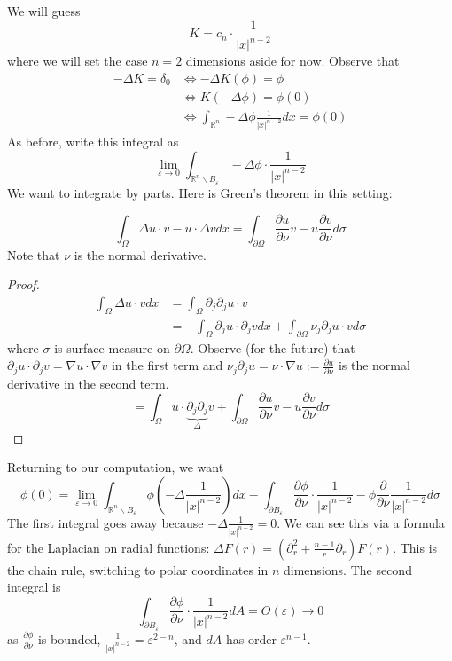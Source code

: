 We will guess
$$
K=c_{n} \cdot \frac{1}{|x|^{n-2}}
$$
where we will set the case $n=2$ dimensions aside for now. Observe that
$$
\begin{aligned}
    -\Delta K=\delta_{0} &\Longleftrightarrow-\Delta K(\phi)=\phi\\
&\Longleftrightarrow K(-\Delta \phi)=\phi(0) \\
&\Longleftrightarrow \int_{\mathbb{R}^{n}}-\Delta \phi \frac{1}{|x|^{n-2}} d x=\phi(0)
\end{aligned}
$$
As before, write this integral as
$$
\lim _{\varepsilon \rightarrow 0} \int_{\mathbb{R}^{n} \backslash B_{\varepsilon}}-\Delta \phi \cdot \frac{1}{|x|^{n-2}}
$$
We want to integrate by parts. Here is Green's theorem in this setting:
\begin{theorem}
\[
    \int_{\Omega} \Delta u \cdot v-u \cdot \Delta v d x=\int_{\partial \Omega} \frac{\partial u}{\partial \nu} v-u \frac{\partial v}{\partial \nu} d \sigma
\]
Note that $\nu$ is the normal derivative.
\end{theorem}
\begin{proof}
    $$
    \begin{aligned}
    \int_{\Omega} \Delta u \cdot v d x &=\int_{\Omega} \partial_{j} \partial_{j} u \cdot v \\
    &=-\int_{\Omega} \partial_{j} u \cdot \partial_{j} v d x+\int_{\partial \Omega} \nu_{j} \partial_{j} u \cdot v d \sigma
    \end{aligned}
    $$
    where $\sigma$ is surface measure on $\partial \Omega$. Observe (for the future) that $\partial_{j} u \cdot \partial_{j} v=\nabla u \cdot \nabla v$ in the first term and $\nu_{j} \partial_{j} u=\nu \cdot \nabla u:=\frac{\partial u}{\partial \nu}$ is the normal derivative in the second term.
    $$
    =\int_{\Omega} u \cdot \underbrace{\partial_{j} \partial_{j}}_{\Delta} v+\int_{\partial \Omega} \frac{\partial u}{\partial \nu} v-u \frac{\partial v}{\partial \nu} d \sigma
    $$
        
\end{proof}
Returning to our computation, we want
$$
\phi(0)=\lim _{\varepsilon \rightarrow 0} \int_{\mathbb{R}^{n} \backslash B_{\varepsilon}} \phi\left(-\Delta \frac{1}{|x|^{n-2}}\right) d x-\int_{\partial B_{\varepsilon}} \frac{\partial \phi}{\partial \nu} \cdot \frac{1}{|x|^{n-2}}-\phi \frac{\partial}{\partial \nu} \frac{1}{|x|^{n-2}} d \sigma
$$
The first integral goes away because $-\Delta \frac{1}{|x|^{n-2}}=0$. We can see this via a formula for the Laplacian on radial functions: $\Delta F(r)=\left(\partial_{r}^{2}+\frac{n-1}{r} \partial_{r}\right) F(r)$. This is the chain rule, switching to polar coordinates in $n$ dimensions.
The second integral is
$$
\int_{\partial B_{\varepsilon}} \frac{\partial \phi}{\partial \nu} \cdot \frac{1}{|x|^{n-2}} d A=O(\varepsilon) \rightarrow 0
$$
as $\frac{\partial \phi}{\partial \nu}$ is bounded, $\frac{1}{|x|^{n-2}}=\varepsilon^{2-n}$, and $d A$ has order $\varepsilon^{n-1}$.

